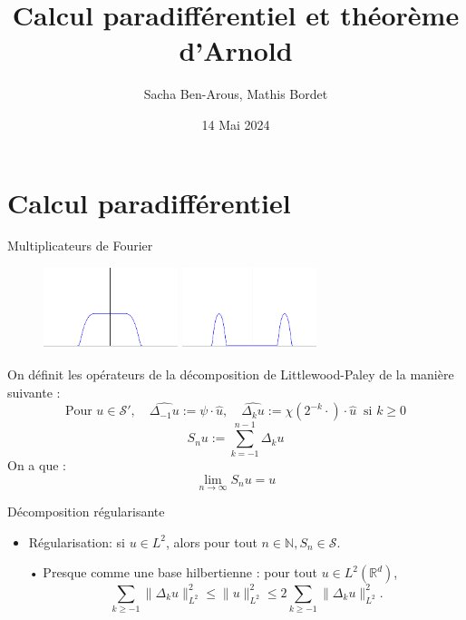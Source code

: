 \documentclass[10pt]{beamer}
\title{Calcul paradifférentiel et théorème d'Arnold}
\date{14 Mai 2024}
\author{Sacha Ben-Arous, Mathis Bordet}
\institute{ENS Paris-Saclay}
\begin{document}
  \maketitle
\begin{frame}
\tableofcontents
\end{frame}  

\section{Calcul paradifférentiel}


\begin{frame}{Multiplicateurs de Fourier}
\begin{figure}
\includegraphics[width=0.35\textwidth]{psi.png}
\includegraphics[width=0.35\textwidth]{chi.png}
\end{figure}
On définit les opérateurs de la décomposition de Littlewood-Paley de la manière suivante :
\[
\text{Pour } u \in \mathcal{S}', \quad \widehat{\Delta_{-1} u} := \psi \cdot \hat{u}, \quad \widehat{\Delta_{k} u} := \chi(2^{-k} \cdot) \cdot \hat{u} \ \text{ si } k \geq 0
\]
\[ S_n u := \sum_{k=-1}^{n-1} \Delta_k u \]
On a que :
\[ \lim_{n \to \infty} S_n u = u \]
\end{frame}


\begin{frame}{Décomposition régularisante}
\begin{itemize}
\item Régularisation: si $u\in L^2$, alors pour tout $n\in \mathbb{N}, S_n \in \mathcal{S}$.
\item[•] Presque comme une base hilbertienne : pour tout $u\in L^2(\mathbb{R}^d)$, 
\[\sum_{k \geq -1} \|\Delta_k u \|^2_{L^2} \leq \| u \|^2_{L^2} \leq 2 \sum_{k \geq -1} \|\Delta_k u \|^2_{L^2}. \]
\end{itemize}
\end{frame}
\end{document}
